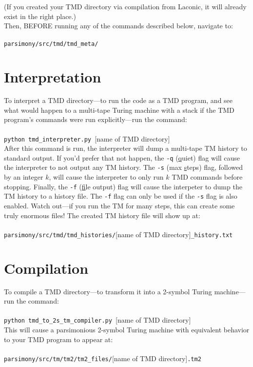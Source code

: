 \documentclass[11pt]{article}
\begin{document}
(If you created your TMD directory via compilation from Laconic, it will already exist in the right place.) \\

Then, BEFORE running any of the commands described below, navigate to: \\ \\
\texttt{parsimony/src/tmd/tmd_meta/}

\section{Interpretation}

To interpret a TMD directory---to run the code as a TMD program, and see what would happen to a multi-tape Turing machine with a stack if the TMD program's commands were run explicitly---run the command: \\ \\ 
\texttt{python tmd_interpreter.py }[name of TMD directory] \\

After this command is run, the interpreter will dump a multi-tape TM history to standard output. If you'd prefer that not happen, the \texttt{-q} (\underline{q}uiet) flag will cause the interpreter to not output any TM history. The \texttt{-s} (max \underline{s}teps) flag, followed by an integer $k$, will cause the interpreter to only run $k$ TMD commands before stopping. Finally, the \texttt{-f} (\underline{f}ile output) flag will cause the interpeter to dump the TM history to a history file. The \texttt{-f} flag can only be used if the \texttt{-s} flag is also enabled. Watch out---if you run the TM for many steps, this can create some truly enormous files! The created TM history file will show up at: \\ \\
\texttt{parsimony/src/tmd/tmd_histories/}[name of TMD directory]\texttt{_history.txt}

\section{Compilation}

To compile a TMD directory---to transform it into a 2-symbol Turing machine---run the command: \\ \\
\texttt{python tmd_to_2s_tm_compiler.py }[name of TMD directory] \\

This will cause a parsimonious 2-symbol Turing machine with equivalent behavior to your TMD program to appear at: \\ \\
\texttt{parsimony/src/tm/tm2/tm2_files/}[name of TMD directory]\texttt{.tm2}
\end{document}
